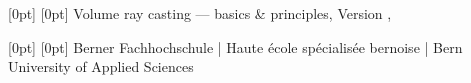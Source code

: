 \documentclass[
    a4paper,      %
    10pt,         %
    openright,    %
    notitlepage,  %
    parskip=half, %
]{scrreprt}       %
\theoremstyle{definition}                    %
\begin{document}

\providecommand{\titel}{Volume ray casting --- basics \& principles}

  [0pt] %
  [0pt] %
  {} %
  {} %
  {} %
  {\color{bfhgrey} \footnotesize \titel, Version \vhCurrentVersion,
      \vhCurrentDate} %
  {} %
  {\color{bfhgrey} \thepage} %

  [0pt] %
  [0pt] %
  {} %
  {} %
  {} %
  {\color{bfhgrey}\fontsize{9pt}{10pt}\selectfont
    Berner Fachhochschule | Haute école spécialisée bernoise | Bern
    University of Applied Sciences} %
  {} %
  {} %


\pagestyle{newlayout}
\renewcommand{\chapterpagestyle}{newlayout}
\renewcommand{\chaptermark}[1]{\markboth{\thechapter.  #1}{}}
\renewcommand*{\headfont}{\normalfont}
\renewcommand*{\footfont}{\normalfont}

\setcounter{page}{1}




\tableofcontents
\cleardoublepage{}









\end{document}
